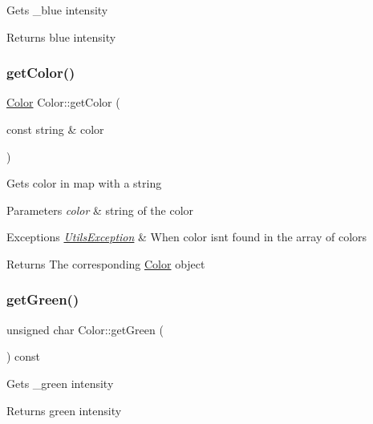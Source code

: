 Gets \+\_\+blue intensity \begin{DoxyReturn}{Returns}
blue intensity 
\end{DoxyReturn}
\hypertarget{class_color_a94697e8c9eb81124c5a7c1439e1e7348}{}\label{class_color_a94697e8c9eb81124c5a7c1439e1e7348} 
\subsubsection{\texorpdfstring{get\+Color()}{getColor()}}
{\footnotesize\ttfamily \hyperlink{class_color}{Color} Color\+::get\+Color (\begin{DoxyParamCaption}\item[{const string \&}]{color }\end{DoxyParamCaption})\hspace{0.3cm}{\ttfamily [static]}}

Gets color in map with a string 
\begin{DoxyParams}{Parameters}
{\em color} & string of the color \\
\hline
\end{DoxyParams}

\begin{DoxyExceptions}{Exceptions}
{\em \hyperlink{class_utils_exception}{Utils\+Exception}} & When color isn\textquotesingle{}t found in the array of colors \\
\hline
\end{DoxyExceptions}
\begin{DoxyReturn}{Returns}
The corresponding \hyperlink{class_color}{Color} object 
\end{DoxyReturn}
\hypertarget{class_color_ae97f0bb0f55f82c2e824899d9f8f60ad}{}\label{class_color_ae97f0bb0f55f82c2e824899d9f8f60ad} 
\subsubsection{\texorpdfstring{get\+Green()}{getGreen()}}
{\footnotesize\ttfamily unsigned char Color\+::get\+Green (\begin{DoxyParamCaption}{ }\end{DoxyParamCaption}) const}

Gets \+\_\+green intensity \begin{DoxyReturn}{Returns}
green intensity 
\end{DoxyReturn}
\hypertarget{class_color_a366040ee493dc797f3877c747f70245e}{}\label{class_color_a366040ee493dc797f3877c747f70245e} 
